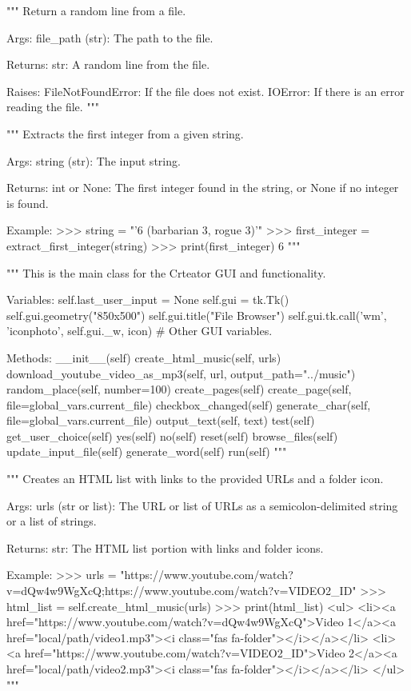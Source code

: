 \begin{codebox}
"""
Return a random line from a file.

Args:
    file_path (str): The path to the file.

Returns:
    str: A random line from the file.

Raises:
    FileNotFoundError: If the file does not exist.
    IOError: If there is an error reading the file.
"""
\end{codebox}

\begin{codebox}
"""
Extracts the first integer from a given string.

Args:
    string (str): The input string.

Returns:
    int or None: The first integer found in the string, or None if no integer is found.

Example:
    >>> string = "'6 (barbarian 3, rogue 3)'"
    >>> first_integer = extract_first_integer(string)
    >>> print(first_integer)
    6
"""
\end{codebox}

\begin{classbox}
"""
This is the main class for the Crteator GUI and functionality.

Variables:
	self.last_user_input = None
	self.gui = tk.Tk()
	self.gui.geometry("850x500")
	self.gui.title("File Browser")
	self.gui.tk.call('wm', 'iconphoto', self.gui._w, icon)
	# Other GUI variables.
	
Methods:
	__init__(self)
	create_html_music(self, urls)
	download_youtube_video_as_mp3(self, url, output_path="../music")
	random_place(self, number=100)
	create_pages(self)
	create_page(self, file=global_vars.current_file)
	checkbox_changed(self)
	generate_char(self, file=global_vars.current_file)
	output_text(self, text)
	test(self)
	get_user_choice(self)
	yes(self)
	no(self)
	reset(self)
	browse_files(self)
	update_input_file(self)
	generate_word(self)
	run(self)
"""
\end{classbox}

\begin{codebox}
"""
Creates an HTML list with links to the provided URLs and a folder icon.

Args:
    urls (str or list): The URL or list of URLs as a semicolon-delimited string or a list of strings.

Returns:
    str: The HTML list portion with links and folder icons.

Example:
    >>> urls = "https://www.youtube.com/watch?v=dQw4w9WgXcQ;https://www.youtube.com/watch?v=VIDEO2_ID"
    >>> html_list = self.create_html_music(urls)
    >>> print(html_list)
    <ul>
    <li><a href="https://www.youtube.com/watch?v=dQw4w9WgXcQ">Video 1</a><a href="local/path/video1.mp3"><i class="fas fa-folder"></i></a></li>
    <li><a href="https://www.youtube.com/watch?v=VIDEO2_ID">Video 2</a><a href="local/path/video2.mp3"><i class="fas fa-folder"></i></a></li>
    </ul>
"""
\end{codebox}

